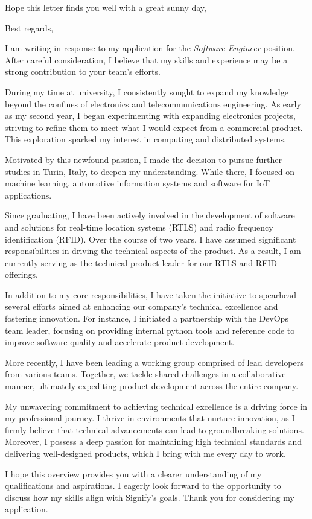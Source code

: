 \documentclass[11pt,a4paper,roman]{moderncv}
\begin{document}
\date{\today}
\opening{Hope this letter finds you well with a great sunny day,}
\closing{Best regards,}
\makelettertitle

I am writing in response to my application for the \emph{Software Engineer} position. After careful consideration, I believe that my skills and experience may be a strong contribution to your team's efforts.

During my time at university, I consistently sought to expand my knowledge beyond the confines of electronics and telecommunications engineering. As early as my second year, I began experimenting with expanding electronics projects, striving to refine them to meet what I would expect from a commercial product. This exploration sparked my interest in computing and distributed systems.

Motivated by this newfound passion, I made the decision to pursue further studies in Turin, Italy, to deepen my understanding. While there, I focused on machine learning, automotive information systems and software for IoT applications.

Since graduating, I have been actively involved in the development of software and solutions for real-time location systems (RTLS) and radio frequency identification (RFID). Over the course of two years, I have assumed significant responsibilities in driving the technical aspects of the product. As a result, I am currently serving as the technical product leader for our RTLS and RFID offerings.

In addition to my core responsibilities, I have taken the initiative to spearhead several efforts aimed at enhancing our company's technical excellence and fostering innovation. For instance, I initiated a partnership with the DevOps team leader, focusing on providing internal python tools and reference code to improve software quality and accelerate product development.

More recently, I have been leading a working group comprised of lead developers from various teams. Together, we tackle shared challenges in a collaborative manner, ultimately expediting product development across the entire company.

My unwavering commitment to achieving technical excellence is a driving force in my professional journey. I thrive in environments that nurture innovation, as I firmly believe that technical advancements can lead to groundbreaking solutions. Moreover, I possess a deep passion for maintaining high technical standards and delivering well-designed products, which I bring with me every day to work.

I hope this overview provides you with a clearer understanding of my qualifications and aspirations. I eagerly look forward to the opportunity to discuss how my skills align with Signify's goals. Thank you for considering my application.

\vspace{0.5cm}

\makeletterclosing
\end{document}
